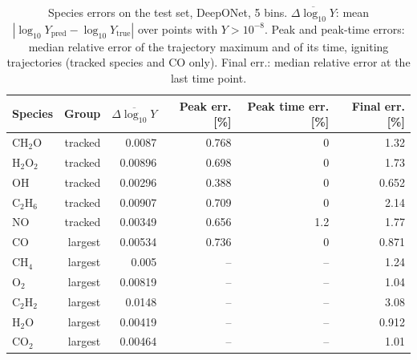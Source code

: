 \begin{table}[htbp]
    \centering
    \small
    \begin{tabular}{lrrrrr}
        \hline
        Species & Group & $\overline{\Delta\log_{10}Y}$ & Peak err. [\%] & Peak time err. [\%] & Final err. [\%] \\
        \hline
        $\mathrm{CH_{2}O}$ & tracked & 0.0087 & 0.768 & 0 & 1.32 \\
        $\mathrm{H_{2}O_{2}}$ & tracked & 0.00896 & 0.698 & 0 & 1.73 \\
        $\mathrm{OH}$ & tracked & 0.00296 & 0.388 & 0 & 0.652 \\
        $\mathrm{C_{2}H_{6}}$ & tracked & 0.00907 & 0.709 & 0 & 2.14 \\
        $\mathrm{NO}$ & tracked & 0.00349 & 0.656 & 1.2 & 1.77 \\
        $\mathrm{CO}$ & largest & 0.00534 & 0.736 & 0 & 0.871 \\
        $\mathrm{CH_{4}}$ & largest & 0.005 & -- & -- & 1.24 \\
        $\mathrm{O_{2}}$ & largest & 0.00819 & -- & -- & 1.04 \\
        $\mathrm{C_{2}H_{2}}$ & largest & 0.0148 & -- & -- & 3.08 \\
        $\mathrm{H_{2}O}$ & largest & 0.00419 & -- & -- & 0.912 \\
        $\mathrm{CO_{2}}$ & largest & 0.00464 & -- & -- & 1.01 \\
        \hline
    \end{tabular}
    \caption{Species errors on the test set, DeepONet, 5 bins. $\overline{\Delta\log_{10}Y}$: mean $|\log_{10}Y_\mathrm{pred}-\log_{10}Y_\mathrm{true}|$ over points with $Y>10^{-8}$. Peak and peak-time errors: median relative error of the trajectory maximum and of its time, igniting trajectories (tracked species and CO only). Final err.: median relative error at the last time point.}
    \label{tab:species_deeponet_predicted_b5_conv}
\end{table}

